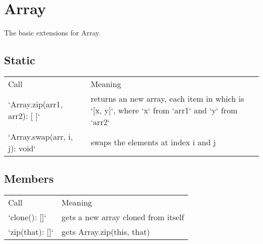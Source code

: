 \section{Array}
The basic extensions for Array.
\subsection{Static}
\begin{tabular}{ll}

Call & Meaning\\
`Array.zip(arr1, arr2): [ ]` & returns an new array, each item in which is `[x, y]`, where `x` from `arr1` and `y` from `arr2`\\
`Array.swap(arr, i, j): void` & swaps the elements at index i and j

\end{tabular}

\subsection{Members}

\begin{tabular}{ll}
Call & Meaning\\
`clone(): []` & gets a new array cloned from itself\\
`zip(that): []` & gets Array.zip(this, that)
\end{tabular}
